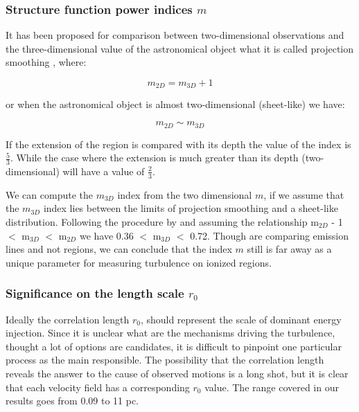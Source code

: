\documentclass[fleqn,usenatbib, useAMS, a4paper]{mnras}
\begin{document}
\subsubsection{Structure function power indices \(m\)}

It has been proposed for comparison between two-dimensional observations and the three-dimensional value of the astronomical object what it is called projection smoothing \citep{von1951methode, munch1958internal,1987ApJ...317..686O}, where:

\begin{equation}\label{eq:exp1}
m_{2D}= m_{3D} + 1
\end{equation}

or when the astronomical object is almost two-dimensional (sheet-like) we have:

\begin{equation}\label{eq:exp2}
m_{2D} \sim m_{3D}
\end{equation}

If the extension of the region is compared with its depth the value of the index is $\frac{5}{3}$. While the case where the extension is much greater than its depth (two-dimensional) will have a value of $\frac{2}{3}$.

We can compute the $m_{3D}$ index from the two dimensional \(m\), if we assume that the $m_{3D}$ index lies between the limits of projection smoothing and a sheet-like distribution. 
Following the procedure by \cite{arthur2016turbulence} and assuming the relationship m$_{2D}$ - 1 $<$ m$_{3D}$ $<$ m$_{2D}$ we have 0.36 $<$ m$_{3D}$ $<$ 0.72.
Though \cite{arthur2016turbulence} are comparing emission lines and not regions, we can conclude that the index \(m\) still is far away as a unique parameter for measuring turbulence on ionized regions.

\subsubsection{Significance on the length scale \(r_0\)}

Ideally the correlation length \(r_0\), should represent the scale of dominant energy injection. 
Since it is unclear what are the mechanisms driving the turbulence, thought a lot of options are candidates, it is difficult to pinpoint one particular process as the main responsible. 
The possibility that the correlation length reveals the answer to the cause of observed motions is a long shot, but it is clear that each velocity field has a corresponding \(r_0\) value. 
The range covered in our results goes from 0.09 to 11 pc.
\end{document}
